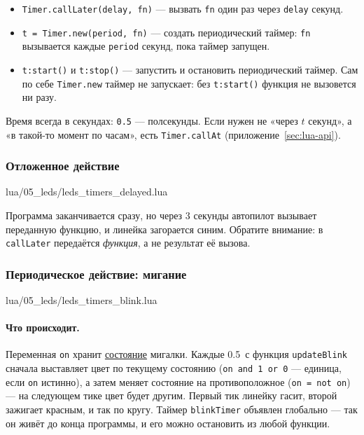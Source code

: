 \begin{codebox}
\begin{itemize}
  \item \verb|Timer.callLater(delay, fn)| --- вызвать \verb|fn| один раз через \verb|delay| секунд.
  \item \verb|t = Timer.new(period, fn)| --- создать периодический таймер: \verb|fn| вызывается каждые \verb|period| секунд, пока таймер запущен.
  \item \verb|t:start()| и \verb|t:stop()| --- запустить и остановить периодический таймер. Сам по себе \verb|Timer.new| таймер не запускает: без \verb|t:start()| функция не вызовется ни разу.
\end{itemize}
Время всегда в секундах: \verb|0.5| --- полсекунды. Если нужен не «через $t$ секунд», а «в такой-то момент по часам», есть \verb|Timer.callAt| (приложение~\ref{sec:lua-api}).
\end{codebox}

\subsubsection*{Отложенное действие}

\begin{codefile}{lua/05_leds/leds_timers_delayed.lua}
\end{codefile}

Программа заканчивается сразу, но через 3 секунды автопилот вызывает переданную функцию, и линейка загорается синим. Обратите внимание: в \verb|callLater| передаётся \emph{функция}, а не результат её вызова.

\subsubsection*{Периодическое действие: мигание}

\begin{codefile}{lua/05_leds/leds_timers_blink.lua}
\end{codefile}

\paragraph{Что происходит.} Переменная \verb|on| хранит \hyperlink{term:state}{состояние} мигалки. Каждые 0.5~с функция \verb|updateBlink| сначала выставляет цвет по текущему состоянию (\verb|on and 1 or 0| --- единица, если \verb|on| истинно), а затем меняет состояние на противоположное (\verb|on = not on|) --- на следующем тике цвет будет другим. Первый тик линейку гасит, второй зажигает красным, и так по кругу. Таймер \verb|blinkTimer| объявлен глобально --- так он живёт до конца программы, и его можно остановить из любой функции.

